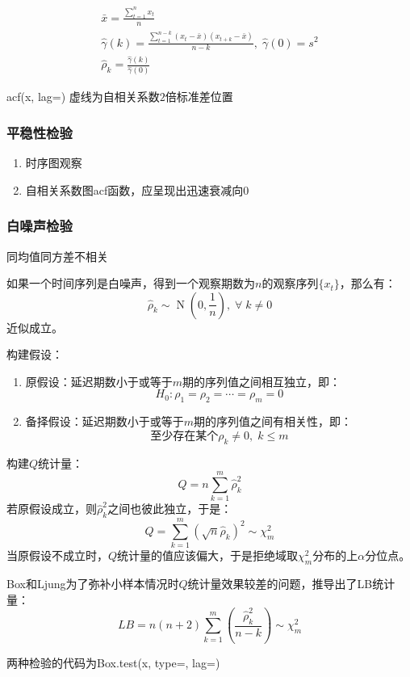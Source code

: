 \begin{gather*}
	\bar{x}=\frac{\sum\limits_{t=1}^{n}x_t}{n} \\
	\hat{\gamma}(k)=\frac{\sum_{t=1}^{n-k}(x_t-\bar{x})(x_{t+k}-\bar{x})}{n-k},\;
	\hat{\gamma}(0)=s^2 \\
	\hat{\rho}_k=\frac{\hat{\gamma}(k)}{\hat{\gamma}(0)}
\end{gather*}

acf(x, lag=)
虚线为自相关系数$2$倍标准差位置

\subsubsection{平稳性检验}
\begin{enumerate}
	\item 时序图观察
	\item 自相关系数图acf函数，应呈现出迅速衰减向$0$
\end{enumerate}

\subsubsection{白噪声检验}
同均值同方差不相关
\begin{theorem}\label{theo:Barlett}
	如果一个时间序列是白噪声，得到一个观察期数为$n$的观察序列$\{x_t\}$，那么有：
	\begin{equation*}
		\hat{\rho}_k\sim\operatorname{N}\left(0,\frac{1}{n}\right),\;\forall\;k\ne0
	\end{equation*}
	近似成立。
\end{theorem}

\begin{derivation}
	构建假设：
	\begin{enumerate}
		\item 原假设：延迟期数小于或等于$m$期的序列值之间相互独立，即：
		\begin{equation*}
			H_0:\rho_1=\rho_2=\cdots=\rho_m=0
		\end{equation*}
		\item 备择假设：延迟期数小于或等于$m$期的序列值之间有相关性，即：
		\begin{equation*}
			\text{至少存在某个}\rho_k\ne0,\;k\leqslant m
		\end{equation*}
	\end{enumerate}
	构建$Q$统计量：
	\begin{equation*}
		Q=n\sum_{k=1}^{m}\hat{\rho}_k^2
	\end{equation*}
	若原假设成立，则$\hat{\rho}_k^2$之间也彼此独立，于是：
	\begin{equation*}
		Q=\sum_{k=1}^{m}(\sqrt{n}\hat{\rho}_k)^2\sim\chi^2_m
	\end{equation*}
	当原假设不成立时，$Q$统计量的值应该偏大，于是拒绝域取$\chi^2_m$分布的上$\alpha$分位点。\par
	Box和Ljung为了弥补小样本情况时$Q$统计量效果较差的问题，推导出了LB统计量：
	\begin{equation*}
		LB=n(n+2)\sum_{k=1}^{m}\left(\frac{\hat{\rho}_k^2}{n-k}\right)\sim\chi^2_m
	\end{equation*}\par
	两种检验的代码为Box.test(x, type=, lag=)
\end{derivation}
